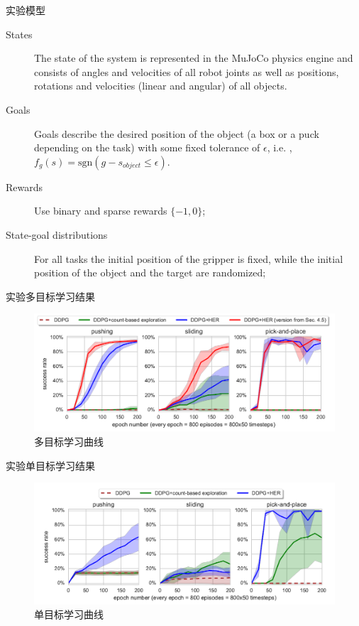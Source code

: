 \documentclass[10pt]{beamer}
\newcommand{\sgn}{\textrm{sgn}}
\begin{document}
	\begin{frame}{实验}{模型}
		\begin{description}
			\item[States] The state of the system is represented in the MuJoCo physics engine and consists of angles and velocities of all robot joints as well as positions, rotations and velocities (linear and angular) of all objects.
			
			\item[Goals] Goals describe the desired position of the object (a box or a puck depending on the task) with some fixed tolerance of $\epsilon$, i.e. , $f_g(s) = \sgn(g-s_{object} \leq \epsilon)$. 
			
			\item[Rewards] Use binary and sparse rewards $\{−1,0\}$;
			
			\item[State-goal distributions] For all tasks the initial position of the gripper is fixed, while the initial position of the object and the target are randomized;
			
		\end{description}
	\end{frame}
	
	\begin{frame}{实验}{多目标学习结果}
		\begin{figure}
			\centering
			\includegraphics[width=0.7\linewidth]{pictures/multi-goal-expr}
			\caption{多目标学习曲线}
			\label{fig:multi-goal-expr}
		\end{figure}
		
	\end{frame}

	\begin{frame}{实验}{单目标学习结果}
		\begin{figure}
			\centering
			\includegraphics[width=0.7\linewidth]{pictures/single-goal-expr}
			\caption{单目标学习曲线}
			\label{fig:single-goal-expr}
		\end{figure}
		
	\end{frame}
\end{document}
